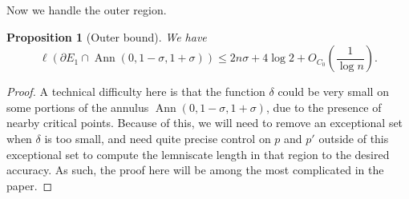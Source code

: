 \documentclass[12pt]{amsart}
\newtheorem{proposition}[theorem]{Proposition}
\newcommand{\Ann}{\operatorname{Ann}}
\begin{document}
Now we handle the outer region.

\begin{proposition}[Outer bound]\label{outside}  We have
    $$ \ell(\partial E_1 \cap \Ann(0,1-\sigma,1+\sigma)) \leq 2n \sigma + 4 \log 2 + O_{C_0}\left( \frac{1}{\log n} \right).$$
\end{proposition}

\begin{proof}  A technical difficulty here is that the function $\delta$ could be very small on some portions of the annulus $\Ann(0,1-\sigma,1+\sigma)$, due to the presence of nearby critical points.  Because of this, we will need to remove an exceptional set when $\delta$ is too small, and need quite precise control on $p$ and $p'$ outside of this exceptional set to compute the lemniscate length in that region to the desired accuracy.  As such, the proof here will be among the most complicated in the paper.


\end{proof}
\end{document}
